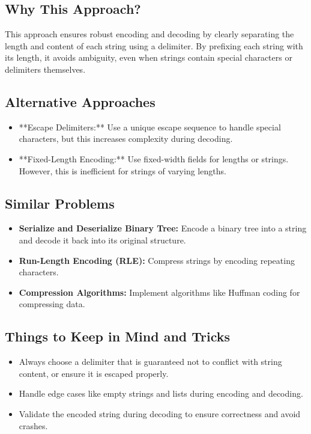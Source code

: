 \subsection*{Why This Approach?}
This approach ensures robust encoding and decoding by clearly separating the length and content of each string using a delimiter. By prefixing each string with its length, it avoids ambiguity, even when strings contain special characters or delimiters themselves.

\subsection*{Alternative Approaches}
\begin{itemize}
    \item **Escape Delimiters:** Use a unique escape sequence to handle special characters, but this increases complexity during decoding.
    \item **Fixed-Length Encoding:** Use fixed-width fields for lengths or strings. However, this is inefficient for strings of varying lengths.
\end{itemize}

\subsection*{Similar Problems}
\begin{itemize}
    \item \textbf{Serialize and Deserialize Binary Tree:} Encode a binary tree into a string and decode it back into its original structure.
    \item \textbf{Run-Length Encoding (RLE):} Compress strings by encoding repeating characters.
    \item \textbf{Compression Algorithms:} Implement algorithms like Huffman coding for compressing data.
\end{itemize}

\subsection*{Things to Keep in Mind and Tricks}
\begin{itemize}
    \item Always choose a delimiter that is guaranteed not to conflict with string content, or ensure it is escaped properly.
    \item Handle edge cases like empty strings and lists during encoding and decoding.
    \item Validate the encoded string during decoding to ensure correctness and avoid crashes.
\end{itemize}

